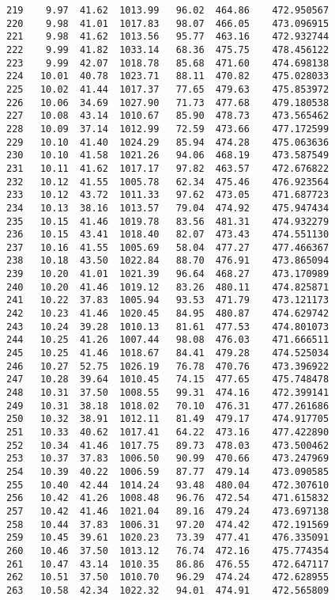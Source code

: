 \documentclass[11pt]{article}
\begin{document}
\begin{tcolorbox}[breakable, size=fbox, boxrule=.5pt, pad at break*=1mm, opacityfill=0]
\begin{Verbatim}[commandchars=\\\{\}]
219    9.97  41.62  1013.99   96.02  464.86    472.950567
220    9.98  41.01  1017.83   98.07  466.05    473.096915
221    9.98  41.62  1013.56   95.77  463.16    472.932744
222    9.99  41.82  1033.14   68.36  475.75    478.456122
223    9.99  42.07  1018.78   85.68  471.60    474.698138
224   10.01  40.78  1023.71   88.11  470.82    475.028033
225   10.02  41.44  1017.37   77.65  479.63    475.853972
226   10.06  34.69  1027.90   71.73  477.68    479.180538
227   10.08  43.14  1010.67   85.90  478.73    473.565462
228   10.09  37.14  1012.99   72.59  473.66    477.172599
229   10.10  41.40  1024.29   85.94  474.28    475.063636
230   10.10  41.58  1021.26   94.06  468.19    473.587549
231   10.11  41.62  1017.17   97.82  463.57    472.676822
232   10.12  41.55  1005.78   62.34  475.46    476.923564
233   10.12  43.72  1011.33   97.62  473.05    471.687723
234   10.13  38.16  1013.57   79.04  474.92    475.947434
235   10.15  41.46  1019.78   83.56  481.31    474.932279
236   10.15  43.41  1018.40   82.07  473.43    474.551130
237   10.16  41.55  1005.69   58.04  477.27    477.466367
238   10.18  43.50  1022.84   88.70  476.91    473.865094
239   10.20  41.01  1021.39   96.64  468.27    473.170989
240   10.20  41.46  1019.12   83.26  480.11    474.825871
241   10.22  37.83  1005.94   93.53  471.79    473.121173
242   10.23  41.46  1020.45   84.95  480.87    474.629742
243   10.24  39.28  1010.13   81.61  477.53    474.801073
244   10.25  41.26  1007.44   98.08  476.03    471.666511
245   10.25  41.46  1018.67   84.41  479.28    474.525034
246   10.27  52.75  1026.19   76.78  470.76    473.396922
247   10.28  39.64  1010.45   74.15  477.65    475.748478
248   10.31  37.50  1008.55   99.31  474.16    472.399141
249   10.31  38.18  1018.02   70.10  476.31    477.261686
250   10.32  38.91  1012.11   81.49  479.17    474.917705
251   10.33  40.62  1017.41   64.22  473.16    477.422890
252   10.34  41.46  1017.75   89.73  478.03    473.500462
253   10.37  37.83  1006.50   90.99  470.66    473.247969
254   10.39  40.22  1006.59   87.77  479.14    473.090585
255   10.40  42.44  1014.24   93.48  480.04    472.307610
256   10.42  41.26  1008.48   96.76  472.54    471.615832
257   10.42  41.46  1021.04   89.16  479.24    473.697138
258   10.44  37.83  1006.31   97.20  474.42    472.191569
259   10.45  39.61  1020.23   73.39  477.41    476.335091
260   10.46  37.50  1013.12   76.74  472.16    475.774354
261   10.47  43.14  1010.35   86.86  476.55    472.647117
262   10.51  37.50  1010.70   96.29  474.24    472.628955
263   10.58  42.34  1022.32   94.01  474.91    472.565809

\end{Verbatim}
\end{tcolorbox}
\end{document}
